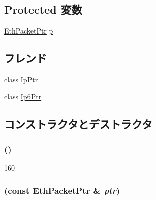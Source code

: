 \subsection*{Protected 変数}
\begin{DoxyCompactItemize}
\item 
\hyperlink{classRefCountingPtr}{EthPacketPtr} \hyperlink{classNet_1_1EthPtr_a764b18a7236ca83fd4bd750516da7d09}{p}
\end{DoxyCompactItemize}
\subsection*{フレンド}
\begin{DoxyCompactItemize}
\item 
class \hyperlink{classNet_1_1EthPtr_a443900f39d853561c56d3bda41a2a423}{IpPtr}
\item 
class \hyperlink{classNet_1_1EthPtr_a9438284c41fe8111a2ca980de73308b2}{Ip6Ptr}
\end{DoxyCompactItemize}


\subsection{コンストラクタとデストラクタ}
\hypertarget{classNet_1_1EthPtr_adf874f340fa266b7e35f19f0b5ad5184}{
\subsubsection[{EthPtr}]{ ()}}
\label{classNet_1_1EthPtr_adf874f340fa266b7e35f19f0b5ad5184}



\begin{DoxyCode}
160 {}
\end{DoxyCode}
\hypertarget{classNet_1_1EthPtr_ae8d736d4c10ee329e7c9a6af3d9ef7e5}{
\subsubsection[{EthPtr}]{ (const {\bf EthPacketPtr} \& {\em ptr})}}
\label{classNet_1_1EthPtr_ae8d736d4c10ee329e7c9a6af3d9ef7e5}



